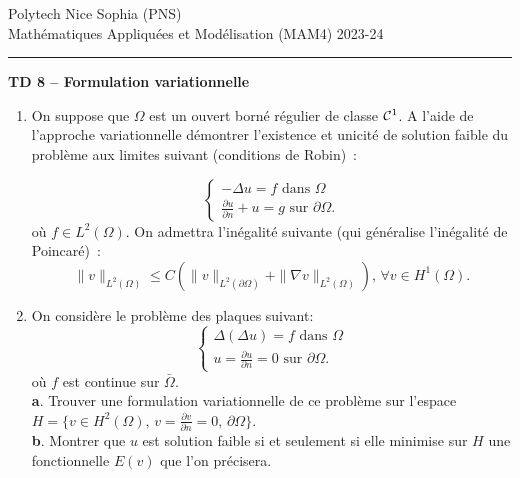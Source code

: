 \documentclass[12pt,a4paper]{article}
\begin{document}
 \hfill Polytech Nice Sophia (PNS)\\
\noindent Math\'ematiques Appliqu\'ees et Mod\'elisation (MAM4) \hfill 2023-24 \\

\hrule

\bigskip
\bigskip

\begin{center} {\bf TD 8 -- Formulation variationnelle} \end{center}

\bigskip

\begin{enumerate}

\item On suppose que $\Omega$ est un ouvert borné régulier de classe ${\cal C}^1$.
A l'aide de l'approche variationnelle démontrer l'existence et unicité de solution faible
du problème aux limites suivant (conditions de Robin)~:

\begin{equation}\label{Robin}
\begin{cases}
-\Delta u = f \text{ dans }\Omega\\
\frac{\partial u}{\partial n} + u = g \text{ sur }\partial\Omega.
\end{cases}
\end{equation}
où $f\in L^2(\Omega)$. On admettra l'inégalité suivante (qui généralise l'inégalité de Poincaré)~:
$$
\|v\|_{L^2(\Omega)} \le C (\|v\|_{L^2(\partial\Omega)} +\| \nabla v\|_{L^2(\Omega)} ),\, \forall v \in H^1(\Omega).
$$

\item On consid\`ere le probl\`eme des plaques suivant:
\begin{equation}\label{Plaque}
\begin{cases}
\Delta(\Delta u) = f \text{ dans }\Omega\\
u = \frac{\partial u}{\partial n} = 0 \text{ sur }\partial\Omega.
\end{cases}
\end{equation}
o\`u $f$ est continue sur $\bar\Omega$.\\
{\bf a}. Trouver une formulation variationnelle de ce probl\`eme sur l'espace
$H=\{v\in H^2(\Omega),\, v=\frac{\partial v}{\partial n}=0,\, \partial\Omega\}$.\\
{\bf b}. Montrer que $u$ est solution faible si et seulement si elle minimise sur $H$
une fonctionnelle $E(v)$ que l'on pr\'ecisera.\\


\end{enumerate}
\end{document}
